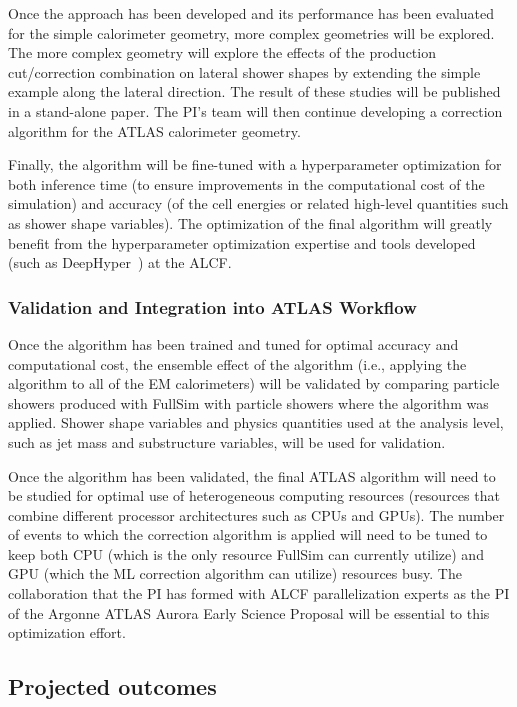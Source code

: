 \documentclass[letter, USenglish, 11pt, subfigure]{article}
\begin{document}
Once the approach has been developed and its performance has been evaluated for the simple calorimeter geometry, more complex geometries will be explored. The more complex geometry will explore the effects of the production cut/correction combination on lateral shower shapes by extending the simple example along the lateral direction. The result of these studies will be published in a stand-alone paper. The PI's team will then continue developing a correction algorithm for the ATLAS calorimeter geometry.

Finally, the algorithm will be fine-tuned with a hyperparameter optimization for both inference time (to ensure improvements in the computational cost of the simulation) and accuracy (of the cell energies or related high-level quantities such as shower shape variables). The optimization of the final algorithm will greatly benefit from the hyperparameter optimization expertise and tools developed (such as DeepHyper~\cite{deephyper2,deephyper1}) at the ALCF.

\subsubsection{Validation and Integration into ATLAS Workflow}

Once the algorithm has been trained and tuned for optimal accuracy and computational cost, the ensemble effect of the algorithm (i.e., applying the algorithm to all of the EM calorimeters) will be validated by comparing particle showers produced with FullSim with particle showers where the algorithm was applied. Shower shape variables and physics quantities used at the analysis level, such as jet mass and substructure variables, will be used for validation.

Once the algorithm has been validated, the final ATLAS algorithm will need to be studied for optimal use of heterogeneous computing resources (resources that combine different processor architectures such as CPUs and GPUs). The number of events to which the correction algorithm is applied will need to be tuned to keep both CPU (which is the only resource FullSim can currently utilize) and GPU (which the ML correction algorithm can utilize) resources busy. The collaboration that the PI has formed with ALCF parallelization experts as the PI of the Argonne ATLAS Aurora Early Science Proposal will be essential to this optimization effort. 

\subsection{Projected outcomes} %
\end{document}
